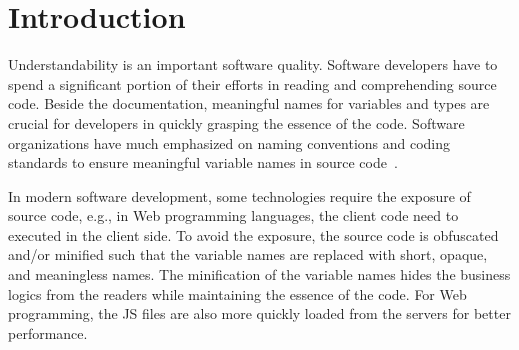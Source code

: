 \section{Introduction}
\label{intro:sec}

Understandability is an important software quality. Software
developers have to spend a significant portion of their efforts in
reading and comprehending source code. Beside the documentation,
meaningful names for variables and types are crucial for developers in
quickly grasping the essence of the code. Software organizations have
much emphasized on naming conventions and coding standards to ensure
meaningful variable names in source
code~\cite{barr-codeconvention-fse14}.



In modern software development, some technologies require the exposure
of source code, e.g., in Web programming languages, the client code
need to executed in the client side. To avoid the exposure, the source
code is obfuscated and/or minified such that the variable names are
replaced with short, opaque, and meaningless names.  The minification
of the variable names hides the business logics from the readers while
maintaining the essence of the code. For Web programming, the JS files
are also more quickly loaded from the servers for better performance.


%
%

